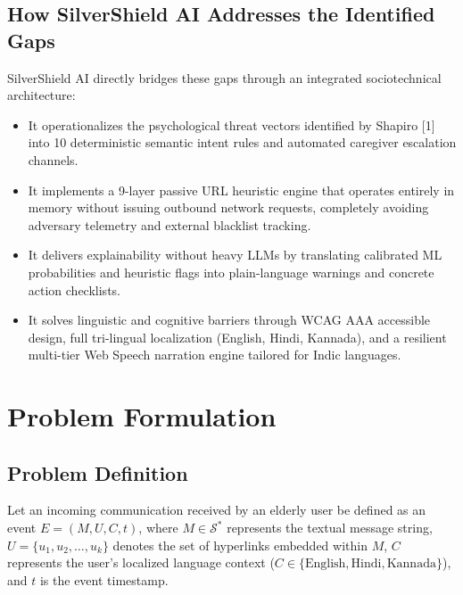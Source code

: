 \documentclass[conference]{IEEEtran}
\begin{document}
\subsection{How SilverShield AI Addresses the Identified Gaps}
SilverShield AI directly bridges these gaps through an integrated sociotechnical architecture:
\begin{itemize}
    \item It operationalizes the psychological threat vectors identified by Shapiro [1] into 10 deterministic semantic intent rules and automated caregiver escalation channels.
    \item It implements a 9-layer passive URL heuristic engine that operates entirely in memory without issuing outbound network requests, completely avoiding adversary telemetry and external blacklist tracking.
    \item It delivers explainability without heavy LLMs by translating calibrated ML probabilities and heuristic flags into plain-language warnings and concrete action checklists.
    \item It solves linguistic and cognitive barriers through WCAG AAA accessible design, full tri-lingual localization (English, Hindi, Kannada), and a resilient multi-tier Web Speech narration engine tailored for Indic languages.

\end{itemize}

\section{Problem Formulation}

\subsection{Problem Definition}
Let an incoming communication received by an elderly user be defined as an event $E = (M, U, C, t)$, where $M \in \mathcal{S}^*$ represents the textual message string, $U = \{u_1, u_2, \dots, u_k\}$ denotes the set of hyperlinks embedded within $M$, $C$ represents the user's localized language context ($C \in \{\text{English}, \text{Hindi}, \text{Kannada}\}$), and $t$ is the event timestamp. 
\end{document}
